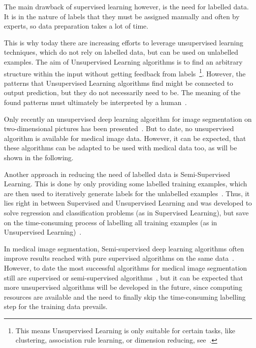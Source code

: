 The main drawback of supervised learning however, is the need for labelled data.
It is in the nature of labels that they must be assigned manually and often by experts, so data preparation takes a lot of time.

This is why today there are increasing efforts to leverage unsupervised learning techniques, which do not rely on labelled data, but can be used on unlabelled examples.
The aim of Unsupervised Learning algorithms is to find an arbitrary structure within the input without getting feedback from labels~\autocite{Burkov2019}\footnote{This means Unsupervised Learning is only suitable for certain tasks, like clustering, association rule learning, or dimension reducing, see~\autocite{Sarker2021}.}.
However, the patterns that Unsupervised Learning algorithms find might be connected to output prediction, but they do not necessarily need to be.
The meaning of the found patterns must ultimately be interpreted by a human~\autocite{Swana2021}.

Only recently an unsupervised deep learning algorithm for image segmentation on two-dimensional pictures has been presented~\autocite{VanGansbeke2021}.
But to date, no unsupervised algorithm is available for medical image data.
However, it can be expected, that these algorithms can be adapted to be used with medical data too, as will be shown in the following.

Another approach in reducing the need of labelled data is Semi-Supervised Learning.
This is done by only providing some labelled training examples, which are then used to iteratively generate labels for the unlabelled examples~\autocite[Chapter 7.9]{Burkov2019}.
Thus, it lies right in between Supervised and Unsupervised Learning and was developed to solve regression and classification problems (as in Supervised Learning), but save on the time-consuming process of labelling all training examples (as in Unsupervised Learning)~\autocite{Burkov2019}.

In medical image segmentation, Semi-supervised deep learning algorithms often improve results reached with pure supervised algorithms on the same data~\autocite{Chebli2018}.
However, to date the most successful algorithms for medical image segmentation still are supervised or semi-supervised algorithms~\autocite{Antonelli2021}, but it can be expected that more unsupervised algorithms will be developed in the future, since computing resources are available and the need to finally skip the time-consuming labelling step for the training data prevails.

